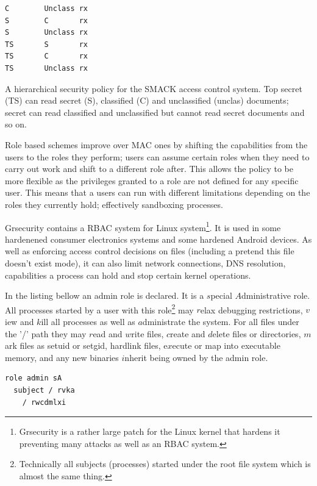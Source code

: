\documentclass[a4paper]{article}
\begin{document}
\begin{marginfigure}
  \begin{lstlisting}
C        Unclass rx
S        C       rx
S        Unclass rx
TS       S       rx
TS       C       rx
TS       Unclass rx
  \end{lstlisting}
  \caption{A hierarchical security policy for the SMACK access control system.
    Top secret (TS) can read secret (S), classified (C) and unclassified
    (unclas) documents; secret can read classified and unclassified but cannot
  read secret documents and so on.}
  \label{smack:hierarchical}
\end{marginfigure}

Role based schemes
improve over \ac{MAC} ones by shifting the capabilities from the users to the
roles they perform; users can assume certain roles when they need to carry out
work and shift to a different role after.  This allows the policy to be more
flexible as the privileges granted to a role are not defined for any specific
user.  This means that a users can run with different limitations
depending on the roles they currently hold; effectively sandboxing processes.

Grsecurity contains a \ac{RBAC} system for Linux system\footnote{Grsecurity is
  a rather large patch for the Linux kernel that hardens it preventing many
  attacks as well as an \ac{RBAC} system.}.  It is used in some hardenened consumer
electronics systems and some hardened Android devices.  As well as enforcing
access control decisions on files (including a pretend this file doesn't exist
mode), it can also limit network connections, DNS
resolution, capabilities a process can hold and stop certain kernel operations.

In the listing bellow an admin role is declared.  It is a $s$pecial
$A$dministrative role.  All processes started by a user with this
role\footnote{Technically all subjects (processes) started under the root file
  system which is almost the same thing.} may $r$elax debugging restrictions,
  $v$iew and $k$ill all processes as well as $a$dministrate the system.
For all files under the '/' path they may $r$ead and $w$rite files, $c$reate and
$d$elete files or directories, $m$ark files as setuid or setgid, hardlink files,
e$x$ecute or map into executable memory, and any new binaries $i$nherit being
owned by the admin role.

\begin{lstlisting}[language=grsec]
role admin sA
  subject / rvka 
    / rwcdmlxi
\end{lstlisting}
\end{document}

